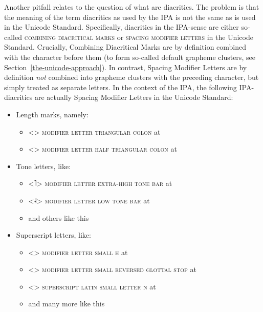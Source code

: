 Another pitfall relates to the question of what are diacritics. The problem is that
the meaning of the term diacritics as used by the IPA is not the same as is used
in the Unicode Standard. Specifically, diacritics in the IPA-sense are either
so-called \textsc{combining diacritical marks} or \textsc{spacing modifier
letters} in the Unicode Standard. Crucially, Combining Diacritical Marks are by
definition combined with the character before them (to form so-called default
grapheme clusters, see Section~\ref{the-unicode-approach}). In contrast, Spacing
Modifier Letters are by definition \emph{not} combined into grapheme clusters
with the preceding character, but simply treated as separate letters. In the
context of the IPA, the following IPA-diacritics are actually Spacing Modifier
Letters in the Unicode Standard:

\begin{itemize}
  
	\item[] Length marks, namely: 
	\begin{itemize}
	  \item[] <> \textsc{modifier letter triangular colon} at 
	  \item[] <> \textsc{modifier letter half triangular colon} at 
	\end{itemize}
	 
	\item[] Tone letters, like: 
	\begin{itemize} 
	  \item[] <˥> \textsc{modifier letter extra-high tone bar} at 
	  \item[] <˨> \textsc{modifier letter low tone bar} at 
	  \item[] and others like this
	\end{itemize}
	
	\item[] Superscript letters, like:
	\begin{itemize}
	  \item[] <> \textsc{modifier letter small h} at 
	  \item[] <> \textsc{modifier letter small reversed glottal stop} at 
	  \item[] <> \textsc{superscript latin small letter n} at 
	  \item[] and many more like this
	\end{itemize}
	

\end{itemize}
